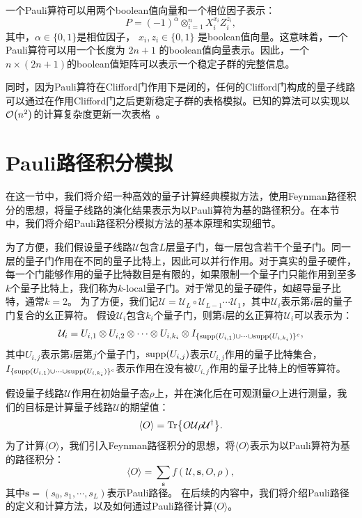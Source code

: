 一个Pauli算符可以用两个boolean值向量和一个相位因子表示：
\begin{equation}
    P = (-1)^\alpha \otimes_{i=1}^n X_i^{x_i} Z_i^{z_i},
\end{equation}
其中，$\alpha\in\{0,1\}$是相位因子，  $x_i, z_i\in\{0,1\}$  是boolean值向量。这意味着，一个Pauli算符可以用一个长度为  $2n+1$  的boolean值向量表示。因此，一个$n\times (2n+1)$的boolean值矩阵可以表示一个稳定子群的完整信息。

同时，因为Pauli算符在Clifford门作用下是闭的，任何的Clifford门构成的量子线路可以通过在作用Clifford门之后更新稳定子群的表格模拟。已知的算法可以实现以$\order{n^2}$的计算复杂度更新一次表格~\cite{PhysRevA.70.052328}。

\section{Pauli路径积分模拟}
在这一节中，我们将介绍一种高效的量子计算经典模拟方法，使用Feynman路径积分的思想，将量子线路的演化结果表示为以Pauli算符为基的路径积分。在本节中，我们将介绍Pauli路径积分模拟方法的基本原理和实现细节。

为了方便，我们假设量子线路$\mathcal{U}$包含$L$层量子门，每一层包含若干个量子门。同一层的量子门作用在不同的量子比特上，因此可以并行作用。对于真实的量子硬件，每一个门能够作用的量子比特数目是有限的，如果限制一个量子门只能作用到至多$k$个量子比特上，我们称为$k$-local量子门。对于常见的量子硬件，如超导量子比特，通常$k=2$。
为了方便，我们记$\mathcal{U} = \mathcal{U}_L\circ \mathcal{U}_{L-1} \cdots \mathcal{U}_1$，其中$\mathcal{U}_i$表示第$i$层的量子门复合的幺正算符。
假设$\mathcal{U}_i$包含$k_i$个量子门，则第$i$层的幺正算符$\mathcal{U}_i$可以表示为：
\begin{equation}
    \mathcal{U}_i = U_{i,1} \otimes U_{i,2} \otimes \cdots \otimes U_{i,k_i}\otimes I_{\{\text{supp}(U_{i,1})\cup \cdots \cup \text{supp}(U_{i,k_i})\}^c},
\end{equation}
其中$U_{i,j}$表示第$i$层第$j$个量子门，$\text{supp}(U_{i,j})$表示$U_{i,j}$作用的量子比特集合，$I_{\{\text{supp}(U_{i,1})\cup \cdots \cup \text{supp}(U_{i,k_i})\}^c}$表示作用在没有被$U_{i,j}$作用的量子比特上的恒等算符。

假设量子线路$\mathcal{U}$作用在初始量子态$\rho$上，并在演化后在可观测量$O$上进行测量，我们的目标是计算量子线路$\mathcal{U}$的期望值：
\begin{equation}
    \langle O \rangle = \Tr{O \mathcal{U} \rho \mathcal{U}^\dagger}.
\end{equation}
为了计算$\langle O \rangle$，我们引入Feynman路径积分的思想，将$\langle O \rangle$表示为以Pauli算符为基的路径积分：
\begin{equation}
    \langle O \rangle = \sum_{\bm{s}} f(\mathcal{U},\bm{s},O,\rho),
\end{equation}
其中$\bm{s} = (s_0, s_1, \cdots, s_L)$表示Pauli路径。
在后续的内容中，我们将介绍Pauli路径的定义和计算方法，以及如何通过Pauli路径计算$\langle O \rangle$。

